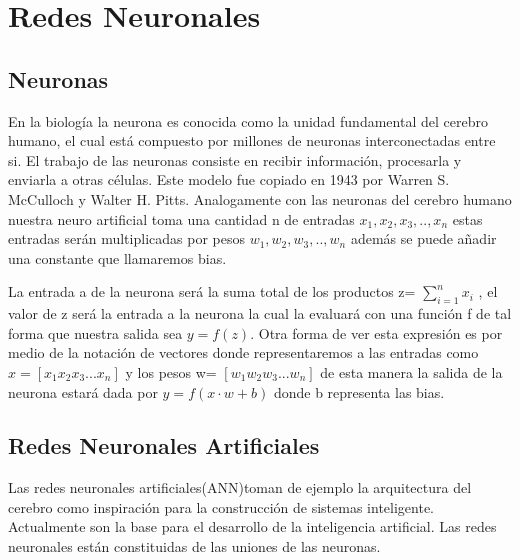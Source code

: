 \section{Redes Neuronales}
\subsection*{Neuronas}
En la biología la neurona es conocida como la unidad fundamental del cerebro humano, el cual está compuesto por millones de neuronas interconectadas entre si. El trabajo de las neuronas consiste en recibir información, procesarla y enviarla a otras células. Este modelo fue copiado en 1943 por Warren S. McCulloch y Walter H. Pitts. Analogamente con las neuronas del cerebro humano nuestra neuro artificial toma una cantidad n de entradas $x_{1}, x_{2}, x_{3}, .. , x_{n}$ estas entradas serán multiplicadas por pesos $w_{1}, w_{2}, w_{3}, .. , w_{n}$ además se puede añadir una constante que llamaremos bias. 

La entrada a de la neurona será la suma total de los productos z=  $\sum_{i=1}^{n}x_{i}$ , el valor de z será la entrada a la neurona la cual la evaluará con una función f de tal forma que nuestra salida sea $y=f(z)$. Otra forma de ver esta expresión es por medio de la notación de vectores donde representaremos a las entradas como $x= [x_{1}  x_{2}  x_{3}  ...  x_{n}]$ y los pesos w= $[w_{1}  w_{2}  w_{3}  ...  w_{n}]$ de esta manera la salida de la neurona estará dada por $y=f(x\cdot w+b)$ donde b representa las bias. 

\subsection*{Redes Neuronales Artificiales}
Las redes neuronales artificiales(ANN)toman de ejemplo la arquitectura del cerebro como inspiración para la construcción de sistemas inteligente. Actualmente son la base para el desarrollo de la inteligencia artificial. Las redes neuronales están constituidas de las uniones de las neuronas. 
